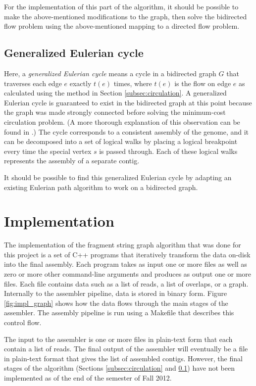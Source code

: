 \documentclass[10pt]{article}
\newcommand{\Figure}[1]{Figure \ref{#1}}
\newcommand{\Subsection}[1]{Section \ref{#1}}
\newcommand{\KeyTerm}[1]{{\it #1}}
\begin{document}
For the implementation of this part of the algorithm, it should be possible to
make the above-mentioned modifications to the graph, then solve the bidirected
flow problem using the above-mentioned mapping to a directed flow problem.

\subsection{Generalized Eulerian cycle}

\label{subsec:eulerian}

Here, a \KeyTerm{generalized Eulerian cycle} means a cycle in a bidirected graph
$G$ that traverses each edge $e$ exactly $t(e)$ times, where $t(e)$ is the flow
on edge $e$ as calculated using the method in \Subsection{subsec:circulation}.
A generalized Eulerian cycle is guaranteed to exist in the bidirected graph at
this point because the graph was made strongly connected before solving the
minimum-cost circulation problem.  (A more thorough explanation of this
observation can be found in \cite{Medvedev2009}.)  The cycle corresponds to a
consistent assembly of the genome, and it can be decomposed into a set of
logical walks by placing a logical breakpoint every time the special vertex $s$
is passed through.  Each of these logical walks represents the assembly of a
separate contig.

It should be possible to find this generalized Eulerian cycle by adapting an
existing Eulerian path algorithm to work on a bidirected graph.

\section{Implementation}

The implementation of the fragment string graph algorithm that was done for this
project is a set of C++ programs that iteratively transform the data on-disk
into the final assembly.  Each program takes as input one or more files as well
as zero or more other command-line arguments and produces as output one or more
files.  Each file contains data such as a list of reads, a list of overlaps, or
a graph.  Internally to the assembler pipeline, data is stored in binary form.
\Figure{fig:impl_graph} shows how the data flows through the main stages of the
assembler.  The assembly pipeline is run using a Makefile that describes this
control flow.

The input to the assembler is one or more files in plain-text form that each
contain a list of reads.  The final output of the assembler will eventually be a
file in plain-text format that gives the list of assembled contigs.  However,
the final stages of the algorithm (Sections \ref{subsec:circulation} and
\ref{subsec:eulerian}) have not been implemented as of the end of the semester
of Fall 2012.
\end{document}
